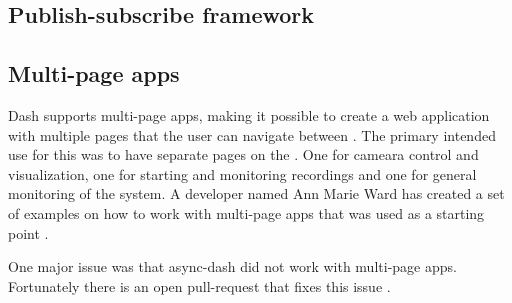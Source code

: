 \subsection{Publish-subscribe framework}

\subsection{Multi-page apps}
Dash supports multi-page apps, making it possible to create a web application with multiple pages that the user can navigate between \cite{plotlyMultiPageAppsURL}.
The primary intended use for this was to have separate pages on the \srgui.
One for cameara control and visualization, one for starting and monitoring recordings and one for general monitoring of the system.
A developer named Ann Marie Ward has created a set of examples on how to work with multi-page apps that was used as a starting point \cite{wardExamplesMultipageApps03Jul22}.

One major issue was that \gls{async-dash} did not work with multi-page apps.
Fortunately there is an open pull-request that fixes this issue \cite{lekAddFlaskRequest2022}.